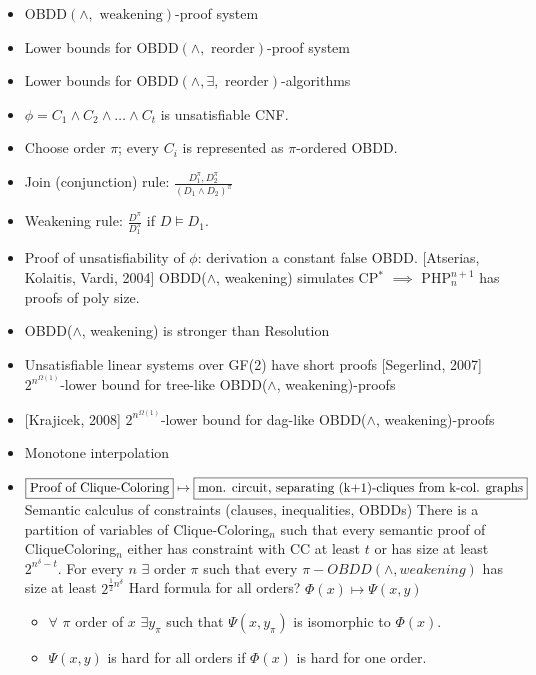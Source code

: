 {
\begin{itemize}
\item OBDD$(\land, \mbox{ weakening})$-proof system
\item Lower bounds for OBDD$(\land, \mbox{ reorder})$-proof system
\item Lower bounds for OBDD$(\land, \exists, \mbox{ reorder})$-algorithms
\end{itemize}
}


{
\begin{itemize}
\item $\phi = C_1\land C_2\land\dots \land C_t$ is unsatisfiable CNF.
\item Choose order $\pi$; every $C_i$ is represented as $\pi$-ordered OBDD.
\item Join (conjunction) rule: $\frac{D_1^{\pi}, D_2^{\pi}} {(D_1\land D_2)^{\pi}}$
\item Weakening rule: $\frac{D^{\pi}}{D_1^{\pi}}$ if $D\models D_1$.
\item Proof of unsatisfiability of $\phi$: derivation a constant false OBDD.
\pitem{} [Atserias, Kolaitis, Vardi, 2004] OBDD($\land$, weakening) simulates CP$^*$ \pause $\implies$ PHP$^{n+1}_n$ has proofs of poly size.
\item OBDD($\land$, weakening) is stronger than Resolution
\item Unsatisfiable linear systems over GF(2) have short proofs
\pitem{} [Segerlind, 2007] $2^{n^{\Omega(1)}}$-lower bound for tree-like OBDD($\land$, weakening)-proofs
\item{} [Krajicek, 2008] $2^{n^{\Omega(1)}}$-lower bound for dag-like OBDD($\land$, weakening)-proofs
\end{itemize}
}

{
\begin{itemize}
\item Monotone interpolation 
\item $\fbox{Proof of Clique-Coloring} \mapsto \fbox{mon. circuit, separating (k+1)-cliques from k-col. graphs}$  
   \pitem Semantic calculus of constraints (clauses, inequalities, OBDDs)
   \pitem \myth [Krajicek, 1998] There is a partition of variables of Clique-Coloring$_n$ such that every semantic proof of CliqueColoring$_n$ either has constraint with CC at least $t$
or has size at least $2^{n^{\delta}-t}$.
\pitem \mycor For every $n$ $\exists$ order $\pi$ such that every $\pi-OBDD(\land, weakening)$ has size at least $2^{\frac12 n^\delta}$ 
\pitem Hard formula for all orders?
\pitem $\Phi(x)\mapsto \Psi(x,y)$
\begin{itemize}
\item $\forall$ $\pi$ order of $x$ $\exists y_{\pi}$ such that $\Psi(x,y_{\pi})$ is isomorphic to $\Phi(x)$.
\item $\Psi(x,y)$ is hard for all orders if $\Phi(x)$ is hard for one order.
\end{itemize}
\end{itemize}
}

